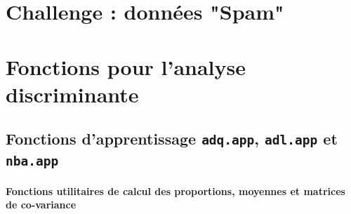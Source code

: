 \documentclass[a4paper,10pt]{report}
\begin{document}
\chapter{Challenge : données "Spam"}








































\appendix


\chapter{Fonctions pour l'analyse discriminante}
\label{appendix:functions-ana-disc}

\section{Fonctions d'apprentissage \texttt{adq.app}, \texttt{adl.app} et \texttt{nba.app}}
\label{appendix:functions-ana-disc-app}

\subsubsection{Fonctions utilitaires de calcul des proportions, moyennes et matrices de co-variance}
\end{document}
